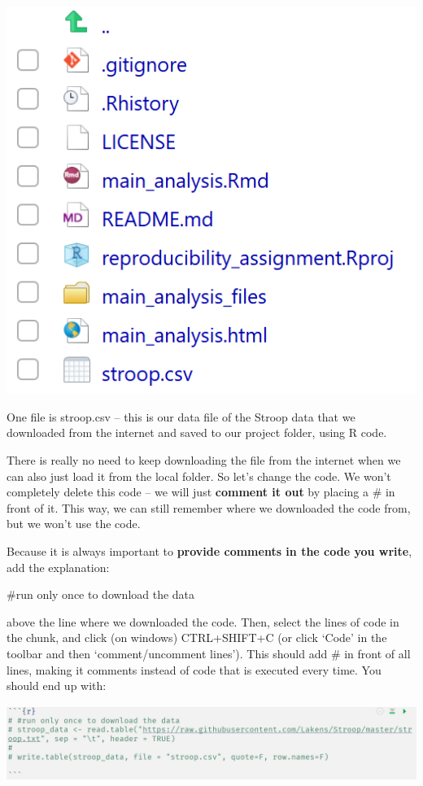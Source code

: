 \documentclass[
  oneside]{book}
\begin{document}
\begin{center}\includegraphics[width=1\linewidth]{images/0ba38e2b99fd3e1a10f943d1ab45f156} \end{center}

One file is stroop.csv -- this is our data file of the Stroop data that we
downloaded from the internet and saved to our project folder, using R code.

There is really no need to keep downloading the file from the internet when we
can also just load it from the local folder. So let's change the code. We won't
completely delete this code -- we will just \textbf{comment it out} by placing a \# in
front of it. This way, we can still remember where we downloaded the code from,
but we won't use the code.

Because it is always important to \textbf{provide comments in the code you write},
add the explanation:

\#run only once to download the data

above the line where we downloaded the code. Then, select the lines of code in
the chunk, and click (on windows) CTRL+SHIFT+C (or click `Code' in the toolbar
and then `comment/uncomment lines'). This should add \# in front of all lines,
making it comments instead of code that is executed every time. You should end
up with:

\begin{center}\includegraphics[width=1\linewidth]{images/0061d311bf4819c08afde5f9b110f9b6} \end{center}
\end{document}
